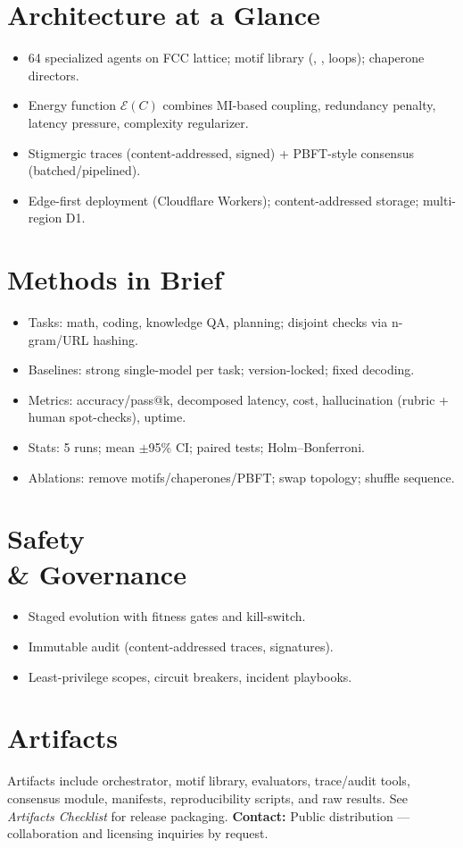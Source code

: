 \documentclass[11pt]{article}
\begin{document}
\section*{Architecture at a Glance}
\begin{itemize}[leftmargin=1.1em]
\item 64 specialized agents on FCC lattice; motif library (\alpha, \beta, loops); chaperone directors.
\item Energy function $\mathcal{E}(C)$ combines MI-based coupling, redundancy penalty, latency pressure, complexity regularizer.
\item Stigmergic traces (content-addressed, signed) + PBFT-style consensus (batched/pipelined).
\item Edge-first deployment (Cloudflare Workers); content-addressed storage; multi-region D1.
\end{itemize}
\section*{Methods in Brief}
\begin{itemize}[leftmargin=1.1em]
\item Tasks: math, coding, knowledge QA, planning; disjoint checks via n-gram/URL hashing.
\item Baselines: strong single-model per task; version-locked; fixed decoding.
\item Metrics: accuracy/pass@k, decomposed latency, cost, hallucination (rubric + human spot-checks), uptime.
\item Stats: 5 runs; mean $\pm$95\% CI; paired tests; Holm--Bonferroni.
\item Ablations: remove motifs/chaperones/PBFT; swap topology; shuffle sequence.
\end{itemize}
\section*{Safety \\ \& Governance}
\begin{itemize}[leftmargin=1.1em]
\item Staged evolution with fitness gates and kill-switch.
\item Immutable audit (content-addressed traces, signatures).
\item Least-privilege scopes, circuit breakers, incident playbooks.
\end{itemize}
\section*{Artifacts}
Artifacts include orchestrator, motif library, evaluators, trace/audit tools, consensus module, manifests, reproducibility scripts, and raw results. See \emph{Artifacts Checklist} for release packaging.
\vfill
\noindent \textbf{Contact:} Public distribution --- collaboration and licensing inquiries by request.
\end{document}
